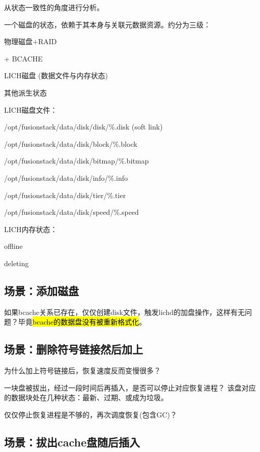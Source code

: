 从状态一致性的角度进行分析。

一个磁盘的状态，依赖于其本身与关联元数据资源。约分为三级：
\begin{enumbox}
\item 物理磁盘+RAID
\item + BCACHE
\item LICH磁盘 (数据文件与内存状态)
\end{enumbox}

其他派生状态

LICH磁盘文件：
\begin{enumbox}
\item /opt/fusionstack/data/disk/disk/\%.disk (soft link)
\item /opt/fusionstack/data/disk/block/\%.block
\item /opt/fusionstack/data/disk/bitmap/\%.bitmap
\item /opt/fusionstack/data/disk/info/\%.info
\item /opt/fusionstack/data/disk/tier/\%.tier
\item /opt/fusionstack/data/disk/speed/\%.speed
\end{enumbox}

LICH内存状态：
\begin{enumbox}
\item offline
\item deleting
\end{enumbox}

\subsection{场景：添加磁盘}

如果bcache关系已存在，仅仅创建disk文件，触发lichd的加盘操作，这样有无问题？毕竟\hl{bcache的数据盘没有被重新格式化}。

\subsection{场景：删除符号链接然后加上}

为什么加上符号链接后，恢复速度反而变慢很多？

一块盘被拔出，经过一段时间后再插入，是否可以停止对应恢复进程？
该盘对应的数据块处在几种状态：最新、过期、或成为垃圾。

仅仅停止恢复进程是不够的，再次调度恢复(包含GC)？

\subsection{场景：拔出cache盘随后插入}

